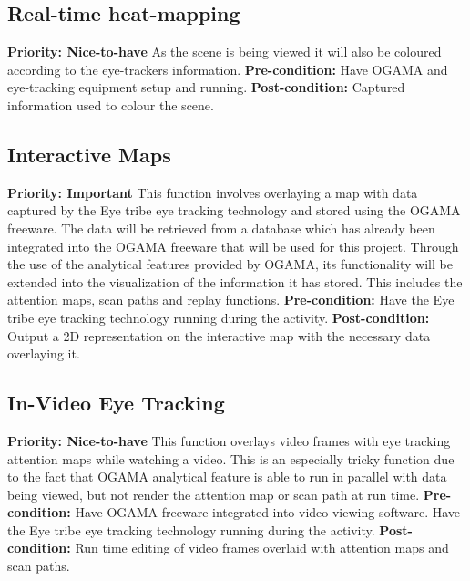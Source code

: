 \subsection{Real-time heat-mapping}
    \textbf{Priority: Nice-to-have}\newline
    As the scene is being viewed it will also be coloured according to the eye-trackers information.\newline
    \textbf{Pre-condition: }
    Have OGAMA and eye-tracking equipment setup and running.\newline
    \textbf{Post-condition: }
    Captured information used to colour the scene.
    
\subsection{Interactive Maps}
    \textbf{Priority: Important}\newline
    This function involves overlaying a map with data captured by the Eye tribe eye tracking technology and stored using the OGAMA freeware. The data will be retrieved from a database which has already been integrated into the OGAMA freeware that will be used for this project. Through the use of the analytical features provided by OGAMA, its functionality will be extended into the visualization of the information it has stored. This includes the attention maps, scan paths and replay functions.\newline
    \textbf{Pre-condition: } Have the Eye tribe eye tracking technology running during the activity.\newline   
    \textbf{Post-condition: }Output a 2D representation on the interactive map with the necessary data overlaying it. 
    
\subsection{In-Video Eye Tracking}
    \textbf{Priority: Nice-to-have}\newline
    This function overlays video frames with eye tracking attention maps while watching a video. This is an especially tricky function due to the fact that OGAMA analytical feature is able to run in parallel with data being viewed, but not render the attention map or scan path at run time.\newline
    \textbf{Pre-condition: }Have OGAMA freeware integrated into video viewing software. Have the Eye tribe eye tracking technology running during the activity.\newline
    \textbf{Post-condition: }Run time editing of video frames overlaid with attention maps and scan paths.

